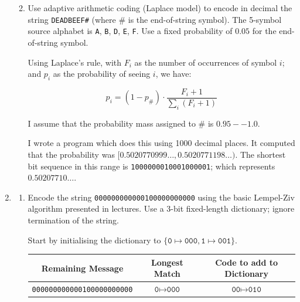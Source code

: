 \documentclass[10pt,\jkfside,a4paper]{article}
\begin{document}
\begin{enumerate}
\begin{enumerate}
\begin{enumerate}
        \end{enumerate}

        \item Use adaptive arithmetic coding (Laplace model) to encode in decimal the string \texttt{DEADBEEF\#} (where $\#$ is the end-of-string symbol). The 5-symbol source alphabet is \texttt{A}, \texttt{B},
        \texttt{D}, \texttt{E}, \texttt{F}. Use a fixed probability of $0.05$ for the end-of-string symbol.

        Using Laplace's rule, with $F_i$ as the number of occurrences of symbol $i$; and $p_i$ as the probability of seeing $i$, we have:

        \[
            p_i = (1 - p_\#) \cdot \frac{F_i + 1}{\sum_i (F_i + 1)}
        \]

        I assume that the probability mass assigned to $\#$ is $0.95--1.0$.

        I wrote a program which does this using 1000 decimal places. It computed that the probability was $[0.5020770999\ldots, 0.5020771198\ldots)$. The shortest bit sequence in this range is \texttt{1000000010001000001}; which represents $0.50207710\ldots$.



    \end{enumerate}

    \item

    \begin{enumerate}

        \item Encode the string \texttt{000000000000100000000000} using the basic Lempel-Ziv algorithm presented in lectures. Use a 3-bit fixed-length dictionary; ignore termination of the string.

        Start by initialising the dictionary to $\{\texttt{0} \mapsto \texttt{000}, \texttt{1} \mapsto \texttt{001}\}$.

        \begin{table}[H]

            \centering

            \begin{tabular}{ccc}
                \toprule

                Remaining Message & Longest Match & Code to add to Dictionary \\

                \midrule

                \texttt{000000000000100000000000} & $\texttt{0} \mapsto \texttt{000}$ & $\texttt{00} \mapsto \texttt{010}$ \\


\end{tabular}
\end{table}
\end{enumerate}
\end{enumerate}
\end{document}
